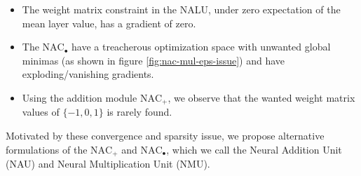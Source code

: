 \begin{itemize}
\item The weight matrix constraint in the NALU, under zero expectation of the mean layer value\cite{glorot-initialization}, has a gradient of zero.

\item The $\text{NAC}_{\bullet}$ have a treacherous optimization space with unwanted global minimas (as shown in figure \ref{fig:nac-mul-eps-issue}) and have exploding/vanishing gradients.

\item Using the addition module $\text{NAC}_{+}$, we observe that the wanted weight matrix values of $\{-1, 0, 1\}$ is rarely found.
\end{itemize}

Motivated by these convergence and sparsity issue, we propose alternative formulations of the $\text{NAC}_{+}$ and $\text{NAC}_{\bullet}$, which we call the Neural Addition Unit (NAU) and Neural Multiplication Unit (NMU).









